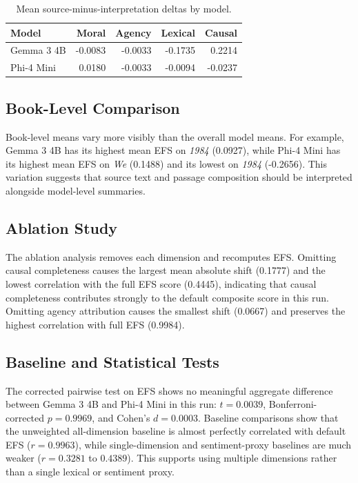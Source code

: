 \documentclass[10pt, conference]{IEEEtran}
\begin{document}
\begin{table}[h]
\centering
\caption{Mean source-minus-interpretation deltas by model.}
\label{tab:dimension_summary}
\scriptsize
\begin{tabular}{lrrrr}
\toprule
\textbf{Model} & \textbf{Moral} & \textbf{Agency} & \textbf{Lexical} & \textbf{Causal} \\
\midrule
Gemma 3 4B & -0.0083 & -0.0033 & -0.1735 & 0.2214 \\
Phi-4 Mini & 0.0180 & -0.0033 & -0.0094 & -0.0237 \\
\bottomrule
\end{tabular}
\end{table}

\subsection{Book-Level Comparison}

Book-level means vary more visibly than the overall model means. For example, Gemma 3 4B has its highest mean EFS on \textit{1984} (0.0927), while Phi-4 Mini has its highest mean EFS on \textit{We} (0.1488) and its lowest on \textit{1984} (-0.2656). This variation suggests that source text and passage composition should be interpreted alongside model-level summaries.

\subsection{Ablation Study}

The ablation analysis removes each dimension and recomputes EFS. Omitting causal completeness causes the largest mean absolute shift (0.1777) and the lowest correlation with the full EFS score (0.4445), indicating that causal completeness contributes strongly to the default composite score in this run. Omitting agency attribution causes the smallest shift (0.0667) and preserves the highest correlation with full EFS (0.9984).

\subsection{Baseline and Statistical Tests}

The corrected pairwise test on EFS shows no meaningful aggregate difference between Gemma 3 4B and Phi-4 Mini in this run: $t=0.0039$, Bonferroni-corrected $p=0.9969$, and Cohen's $d=0.0003$. Baseline comparisons show that the unweighted all-dimension baseline is almost perfectly correlated with default EFS ($r=0.9963$), while single-dimension and sentiment-proxy baselines are much weaker ($r=0.3281$ to $0.4389$). This supports using multiple dimensions rather than a single lexical or sentiment proxy.
\end{document}
